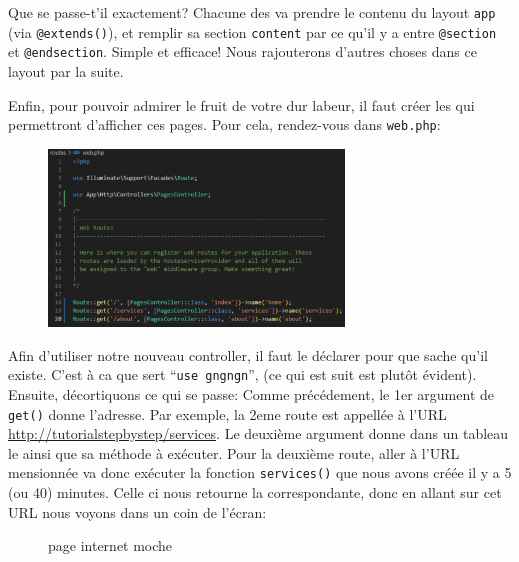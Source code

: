 \documentclass[internal]{nhitec_design}
\begin{document}
Que se passe-t'il exactement? Chacune des \views{} va prendre le contenu du layout \verb|app| (via \verb|@extends()|), et remplir sa section \verb|content| par ce qu'il y a entre \verb|@section| et \verb|@endsection|. Simple et efficace! Nous rajouterons d'autres choses dans ce layout par la suite.

\newpage

Enfin, pour pouvoir admirer le fruit de votre dur labeur, il faut créer les \routes{} qui permettront d'afficher ces pages. Pour cela, rendez-vous dans \verb|web.php|:

\begin{figure}
    \vspace{-0.5cm}
    \includegraphics[width=0.7\textwidth]{figures-C1/3_premieres_routes.pdf}
\end{figure}
Afin d'utiliser notre nouveau controller, il faut le déclarer pour que \laravel{} sache qu'il existe. C'est à ca que sert ``\verb|use gngngn|'', (ce qui est suit est plutôt évident).
Ensuite, décortiquons ce qui se passe: Comme précédement, le 1er argument de \verb|get()| donne l'adresse. Par exemple, la 2eme route est appellée à l'URL \url{http://tutorialstepbystep/services}. Le deuxième argument donne dans un tableau le \controller{} ainsi que sa méthode à exécuter. Pour la deuxième route, aller à l'URL mensionnée va donc exécuter la fonction \verb|services()| que nous avons créée il y a 5 (ou 40) minutes. Celle ci nous retourne la \view{} correspondante, donc en allant sur cet URL nous voyons dans un coin de l'écran:

\begin{figure}[!h]
    \centering
    \caption{page internet moche}
\end{figure}
\end{document}
